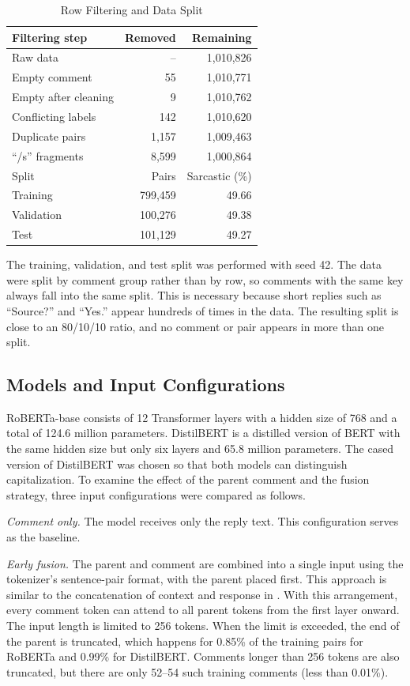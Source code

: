 \documentclass[conference]{IEEEtran}
\begin{document}
\begin{table}[t]
\caption{Row Filtering and Data Split}
\label{tab:data}
\centering
\begin{tabular}{lrr}
\hline
Filtering step & Removed & Remaining \\
\hline
Raw data & -- & 1,010,826 \\
Empty comment & 55 & 1,010,771 \\
Empty after cleaning & 9 & 1,010,762 \\
Conflicting labels & 142 & 1,010,620 \\
Duplicate pairs & 1,157 & 1,009,463 \\
``/s'' fragments & 8,599 & 1,000,864 \\
\hline
Split & Pairs & Sarcastic (\%) \\
\hline
Training & 799,459 & 49.66 \\
Validation & 100,276 & 49.38 \\
Test & 101,129 & 49.27 \\
\hline
\end{tabular}
\end{table}

The training, validation, and test split was performed with seed 42. The data were split by comment group rather than by row, so comments with the same key always fall into the same split. This is necessary because short replies such as ``Source?'' and ``Yes.'' appear hundreds of times in the data. The resulting split is close to an 80/10/10 ratio, and no comment or pair appears in more than one split.

\subsection{Models and Input Configurations}
RoBERTa-base \cite{liu2019roberta} consists of 12 Transformer layers with a hidden size of 768 and a total of 124.6 million parameters. DistilBERT \cite{sanh2019distilbert} is a distilled version of BERT with the same hidden size but only six layers and 65.8 million parameters. The cased version of DistilBERT was chosen so that both models can distinguish capitalization. To examine the effect of the parent comment and the fusion strategy, three input configurations were compared as follows.

\textit{Comment only.} The model receives only the reply text. This configuration serves as the baseline.

\textit{Early fusion.} The parent and comment are combined into a single input using the tokenizer's sentence-pair format, with the parent placed first. This approach is similar to the concatenation of context and response in \cite{ataeii2020transformers}. With this arrangement, every comment token can attend to all parent tokens from the first layer onward. The input length is limited to 256 tokens. When the limit is exceeded, the end of the parent is truncated, which happens for 0.85\% of the training pairs for RoBERTa and 0.99\% for DistilBERT. Comments longer than 256 tokens are also truncated, but there are only 52--54 such training comments (less than 0.01\%).
\end{document}
